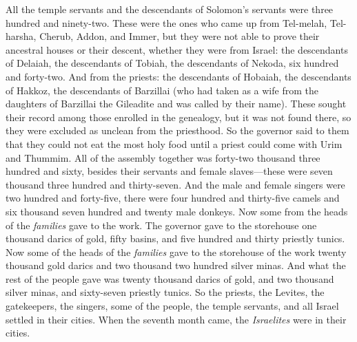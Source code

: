 \begin{biblechapter}
\verse All the temple servants and the descendants of Solomon’s servants were three hundred and ninety-two.
\verse These were the ones who came up from Tel-melah, Tel-harsha, Cherub, Addon, and Immer, but they were not able to prove their ancestral houses or their descent, whether they were from Israel:
\verse the descendants of Delaiah, the descendants of Tobiah, the descendants of Nekoda, six hundred and forty-two.
\verse And from the priests: the descendants of Hobaiah, the descendants of Hakkoz, the descendants of Barzillai (who had taken as a wife from the daughters of Barzillai the Gileadite and was called by their name).
\verse These sought their record among those enrolled in the genealogy, but it was not found there, so they were excluded as unclean from the priesthood.
\verse So the governor said to them that they could not eat the most holy food until a priest could come with Urim and Thummim.
\verse All of the assembly together was forty-two thousand three hundred and sixty,
\verse besides their servants and female slaves—these were seven thousand three hundred and thirty-seven. And the male and female singers were two hundred and forty-five,
\verse  there were four hundred and thirty-five camels and six thousand seven hundred and twenty male donkeys.
\verse Now some from the heads of the \textit{families} gave to the work. The governor gave to the storehouse one thousand darics of gold, fifty basins, and five hundred and thirty priestly tunics.
\verse Now some of the heads of the \textit{families} gave to the storehouse of the work twenty thousand gold darics and two thousand two hundred silver minas.
\verse And what the rest of the people gave was twenty thousand darics of gold, and two thousand silver minas, and sixty-seven priestly tunics.
\verse So the priests, the Levites, the gatekeepers, the singers, some of the people, the temple servants, and all Israel settled in their cities. When the seventh month came, the \textit{Israelites} were in their cities.
\end{biblechapter}


